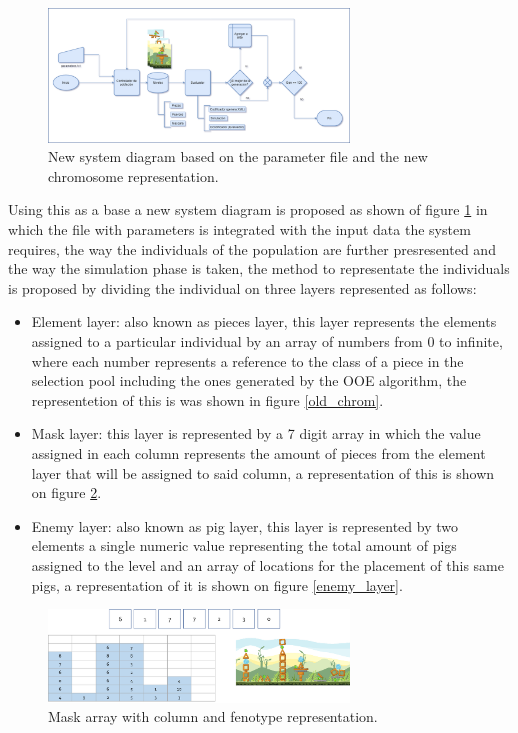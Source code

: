 \documentclass[conference]{IEEEtran}
\begin{document}
\begin{figure}[htbp]
\centerline{\includegraphics[width=80mm]{Images/new_model.png}}
\caption{New system diagram based on the parameter file and the new chromosome representation.}
\label{new_model}
\end{figure}

Using this as a base a new system diagram is proposed as shown of figure
\ref{new_model} in which the file with parameters is integrated with the input
data  the system requires, the way the individuals of the population are further
presresented and the way the simulation phase is taken, the method to
representate the individuals is proposed by dividing the individual on three
layers represented as follows:

\begin{itemize}
    \item Element layer: also known as pieces layer, this layer represents the
    elements assigned to a particular individual by an array of numbers from 0
    to infinite, where each number represents a reference to the class of a piece
    in the selection pool including the ones generated by the OOE algorithm, the
    representetion of this is was shown in figure \ref{old_chrom}.
    \item  Mask layer: this layer is represented by a 7 digit array in which the
    value assigned in each column represents the amount of pieces from the
    element layer that will be assigned to said column, a representation of this
    is shown on figure \ref{mask_layer}.
    \item Enemy layer: also known as pig layer, this layer is represented by two
    elements a single numeric value representing the total amount of pigs
    assigned to the level and an array of locations for the placement of this
    same pigs, a representation of it is shown on figure \ref{enemy_layer}. 
\end{itemize}

\begin{figure}[htbp]
    \centerline{\includegraphics[width=80mm]{Images/mask_layer.png}}
    \caption{Mask array with column and fenotype representation.}
    \label{mask_layer}
\end{figure}
\end{document}
